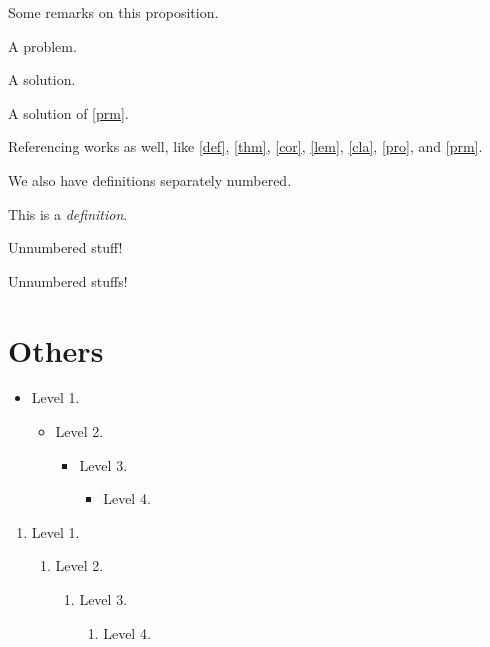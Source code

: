 \documentclass{article}
\begin{document}
\begin{remarks}
    Some remarks on this proposition. \lipsum[13]
\end{remarks}

\begin{problem}
    \label{prm}%
    A problem. \lipsum[14]
\end{problem}

\begin{solution}
    A solution. \lipsum[15]
\end{solution}

\begin{solution}
    A solution of \autoref{prm}. \lipsum[16]
\end{solution}

Referencing works as well, like \autoref{def}, \autoref{thm}, \autoref{cor}, \autoref{lem}, \autoref{cla}, \autoref{pro}, and \autoref{prm}.

We also have definitions separately numbered.

\begin{definition*}
    \label{defs}%
    This is a \emph{definition}. \lipsum[1]
\end{definition*}

\begin{example*}
    Unnumbered stuff! \lipsum[17]
\end{example*}

\begin{examples*}
    Unnumbered stuffs! \lipsum[18]
\end{examples*}

\section{Others}

\begin{itemize}
    \item Level 1.
    \begin{itemize}
        \item Level 2.
        \begin{itemize}
            \item Level 3.
            \begin{itemize}
                \item Level 4.
            \end{itemize}
        \end{itemize}
    \end{itemize}
\end{itemize}

\begin{enumerate}
    \item Level 1.
    \begin{enumerate}
        \item Level 2.
        \begin{enumerate}
            \item Level 3.
            \begin{enumerate}
                \item Level 4.
            \end{enumerate}
        \end{enumerate}
    \end{enumerate}
\end{enumerate}
\end{document}
